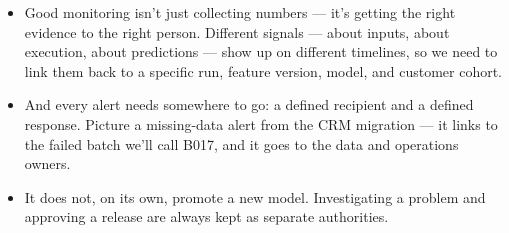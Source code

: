 \documentclass[11pt,a4paper]{article}
\begin{document}
\begin{examplebox}[title after break={SPOKEN SCRIPT --- slide 17 continued}]
\begin{itemize}
\item Good monitoring isn't just collecting numbers — it's getting the right evidence to the right person. Different signals — about inputs, about execution, about predictions — show up on different timelines, so we need to link them back to a specific run, feature version, model, and customer cohort.
\item And every alert needs somewhere to go: a defined recipient and a defined response. Picture a missing-data alert from the CRM migration — it links to the failed batch we'll call B017, and it goes to the data and operations owners.
\item It does not, on its own, promote a new model. Investigating a problem and approving a release are always kept as separate authorities.
\end{itemize}
\end{examplebox}
\par\noindent{\scriptsize\textcolor{teal!60!black}{Reading anchor: Bass, Ch. 11 / §14.1.5 · Teaching expansion of monitoring responsibilities}}
\clearpage
\end{document}
